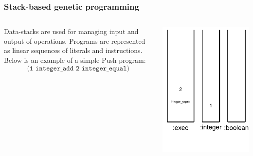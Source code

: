 \documentclass{beamer}
\newcommand{\linespace}{\vskip 0.25cm}
\begin{document}
\begin{frame}
	\frametitle{Stack-based genetic programming}
	\begin{columns}
		\begin{column}{0.65\textwidth}
			Data-stacks are used for managing input and output of operations.
			\linespace
			\linespace
			\linespace
			Programs are represented as linear sequences of literals and instructions. Below is an example of a simple Push program:
			\[\texttt{(1 integer\_add 2 integer\_equal)}\]
		\end{column}
		\begin{column}{0.35\textwidth}
			\includegraphics[height=.7\textheight]{Illustrations/stack_3_8.PDF}
		\end{column}
	\end{columns}
\end{frame}
\end{document}
